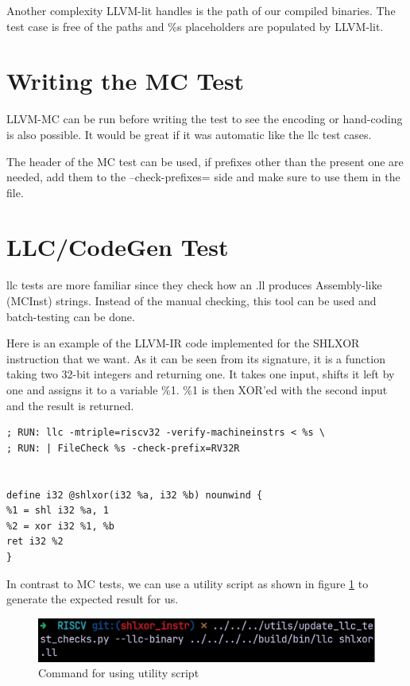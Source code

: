 Another complexity LLVM-lit handles is the path of our compiled binaries. The test case is free of the paths and \%s placeholders are populated by LLVM-lit.

\section{Writing the MC Test}
LLVM-MC can be run before writing the test to see the encoding or hand-coding is also possible. It would be great if it was automatic like the llc test cases.

The header of the MC test can be used, if prefixes other than the present one are needed, add them to the –check-prefixes= side and make sure to use them in the file.

\section{LLC/CodeGen Test}\label{sec:llc_test}
llc tests are more familiar since they check how an .ll produces Assembly-like (MCInst) strings. Instead of the manual checking, this tool can be used and batch-testing can be done.

Here is an example of the LLVM-IR code implemented for the SHLXOR instruction that we want. As it can be seen from its signature, it is a function taking two 32-bit integers and returning one. It takes one input, shifts it left by one and assigns it to a variable \%1. \%1 is then XOR’ed with the second input and the result is returned.

\begin{lstlisting}
; RUN: llc -mtriple=riscv32 -verify-machineinstrs < %s \ 
; RUN: | FileCheck %s -check-prefix=RV32R 


define i32 @shlxor(i32 %a, i32 %b) nounwind { 
%1 = shl i32 %a, 1 
%2 = xor i32 %1, %b 
ret i32 %2 
} 
\end{lstlisting}

In contrast to MC tests, we can use a utility script as shown in figure \ref{fig:command_for_using_utility_script} to generate the expected result for us.

\begin{figure}
    \centering
    \includegraphics{testing/command_for_using_utility_script.png}
    \caption{Command for using utility script}
    \label{fig:command_for_using_utility_script}
\end{figure}

